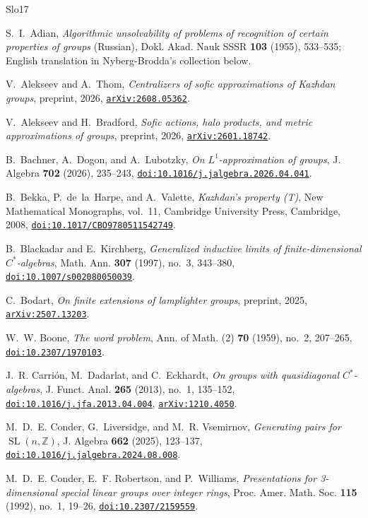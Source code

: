 \documentclass[11pt]{amsart}
\newcommand{\doi}[1]{\href{https://doi.org/#1}{\nolinkurl{doi:#1}}}
\newcommand{\arxiv}[1]{\href{https://arxiv.org/abs/#1}{\nolinkurl{arXiv:#1}}}
\theoremstyle{definition}
\theoremstyle{remark}
\theoremstyle{plain}
\newcommand{\SL}{\operatorname{SL}}
\begin{document}
\begin{thebibliography}{Slo17}
\frenchspacing

S.~I.~Adian,
\emph{Algorithmic unsolvability of problems of recognition of certain
properties of groups} (Russian),
Dokl. Akad. Nauk SSSR \textbf{103} (1955), 533--535;
English translation in Nyberg-Brodda's collection below.

V.~Alekseev and A.~Thom,
\emph{Centralizers of sofic approximations of Kazhdan groups},
preprint, 2026, \arxiv{2608.05362}.

V.~Alekseev and H.~Bradford,
\emph{Sofic actions, halo products, and metric approximations of groups},
preprint, 2026, \arxiv{2601.18742}.

B.~Bachner, A.~Dogon, and A.~Lubotzky,
\emph{On $L^1$-approximation of groups},
J. Algebra \textbf{702} (2026), 235--243,
\doi{10.1016/j.jalgebra.2026.04.041}.

B.~Bekka, P.~de~la~Harpe, and A.~Valette,
\emph{Kazhdan's property \textup{(T)}},
New Mathematical Monographs, vol.~11,
Cambridge University Press, Cambridge, 2008,
\doi{10.1017/CBO9780511542749}.

B.~Blackadar and E.~Kirchberg,
\emph{Generalized inductive limits of finite-dimensional
$C^*$-algebras},
Math. Ann. \textbf{307} (1997), no.~3, 343--380,
\doi{10.1007/s002080050039}.

C.~Bodart,
\emph{On finite extensions of lamplighter groups},
preprint, 2025, \arxiv{2507.13203}.

W.~W. Boone,
\emph{The word problem},
Ann. of Math. (2) \textbf{70} (1959), no.~2, 207--265,
\doi{10.2307/1970103}.

J.~R. Carri\'on, M.~Dadarlat, and C.~Eckhardt,
\emph{On groups with quasidiagonal $C^*$-algebras},
J. Funct. Anal. \textbf{265} (2013), no.~1, 135--152,
\doi{10.1016/j.jfa.2013.04.004}, \arxiv{1210.4050}.

M.~D.~E. Conder, G.~Liversidge, and M.~R. Vsemirnov,
\emph{Generating pairs for $\SL(n,\mathbb Z)$},
J. Algebra \textbf{662} (2025), 123--137,
\doi{10.1016/j.jalgebra.2024.08.008}.

M.~D.~E. Conder, E.~F. Robertson, and P.~Williams,
\emph{Presentations for 3-dimensional special linear groups over integer
rings},
Proc. Amer. Math. Soc. \textbf{115} (1992), no.~1, 19--26,
\doi{10.2307/2159559}.


\end{thebibliography}
\end{document}
